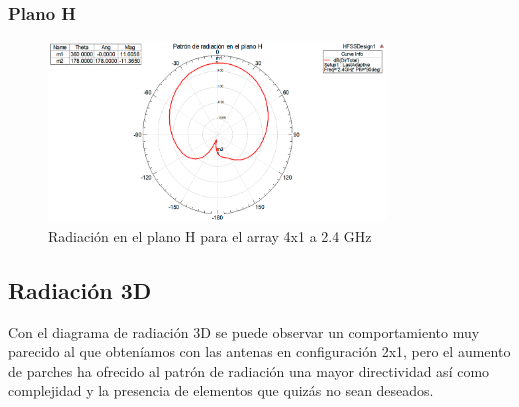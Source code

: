 \subsubsection{Plano H}
\begin{figure}[H]
    \centering
        \includegraphics[width=0.8\textwidth]{archivos/analisis/4x11/5}
        \caption{Radiación en el plano H para el array 4x1 a 2.4 GHz}
        \label{fig:H4x11}
\end{figure}

\subsection{Radiación 3D}
\par Con el diagrama de radiación 3D se puede observar un comportamiento muy parecido al que obteníamos con las antenas en configuración 2x1, pero el aumento de parches ha ofrecido al patrón de radiación una mayor directividad así como complejidad y la presencia de elementos que quizás no sean deseados.

